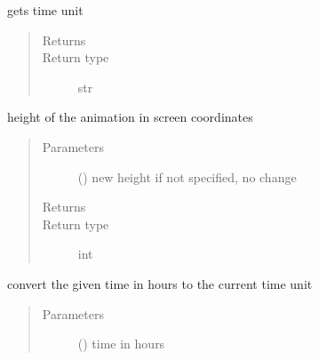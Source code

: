 \documentclass[letterpaper,10pt,english]{sphinxmanual}
\begin{document}
\begin{fulllineitems}
\begin{fulllineitems}
\label{\detokenize{Reference:salabim.Environment.get_time_unit}}
gets time unit
\begin{quote}\begin{description}
\item[{Returns}] \leavevmode
{}

\item[{Return type}] \leavevmode
str

\end{description}\end{quote}

\end{fulllineitems}


\begin{fulllineitems}
\label{\detokenize{Reference:salabim.Environment.height}}
height of the animation in screen coordinates
\begin{quote}\begin{description}
\item[{Parameters}] \leavevmode
{} () \textendash{} new height 
if not specified, no change

\item[{Returns}] \leavevmode
{}

\item[{Return type}] \leavevmode
int

\end{description}\end{quote}

\end{fulllineitems}


\begin{fulllineitems}
\label{\detokenize{Reference:salabim.Environment.hours}}
convert the given time in hours to the current time unit
\begin{quote}\begin{description}
\item[{Parameters}] \leavevmode
{} () \textendash{} time in hours


\end{description}
\end{quote}
\end{fulllineitems}
\end{fulllineitems}
\end{document}
